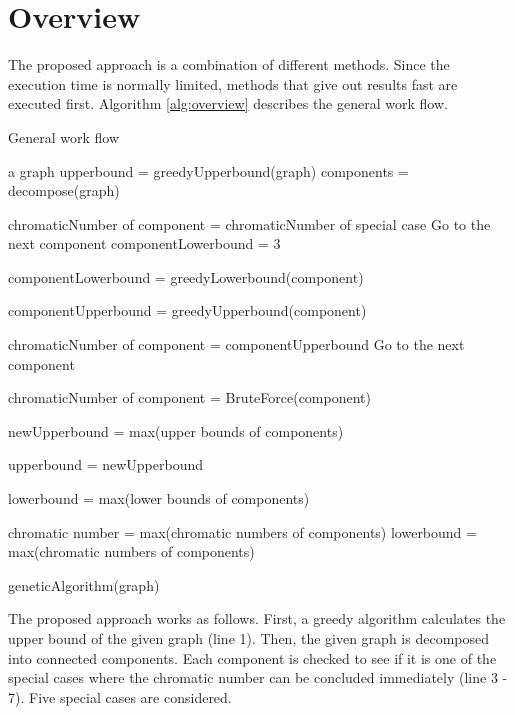 \documentclass[a4paper]{report}
\begin{document}
	\section{Overview}
	The proposed approach is a combination of different methods. Since the execution time is normally limited, methods that give out results fast are executed first. Algorithm \ref{alg:overview} describes the general work flow.\\
	\begin{algorithm}
		\caption{General work flow}
		\label{alg:overview}
		\begin{algorithmic}[1]
			\REQUIRE a graph
			\STATE upperbound = greedyUpperbound(graph)
			\STATE components = decompose(graph)
				
					\STATE chromaticNumber of component = chromaticNumber of special case
					\STATE Go to the next component
				\ELSE 
					\STATE componentLowerbound = 3
				\ENDIF
				
				\STATE componentLowerbound = greedyLowerbound(component)
				\ENDIF
				
				\STATE componentUpperbound =  greedyUpperbound(component)

				\STATE chromaticNumber of component = componentUpperbound
				\STATE Go to the next component
				\ENDIF
				
				\STATE chromaticNumber of component = BruteForce(component)
				\ENDIF 
			\ENDFOR

			\STATE newUpperbound = max(upper bounds of components)
			
			\STATE upperbound = newUpperbound 
			\ENDIF
			
			\STATE lowerbound = max(lower bounds of components)
			
			\STATE chromatic number = max(chromatic numbers of components)
			\ELSE
			\STATE lowerbound = max(chromatic numbers of components)
			\ENDIF
			
			\STATE geneticAlgorithm(graph)
		\end{algorithmic}
	\end{algorithm}
	The proposed approach works as follows. First, a greedy algorithm calculates the upper bound of the given graph (line 1). Then, the given graph is decomposed into connected components. Each component is checked to see if it is one of the special cases where the chromatic number can be concluded immediately (line 3 - 7). Five special cases are considered.
\end{document}
